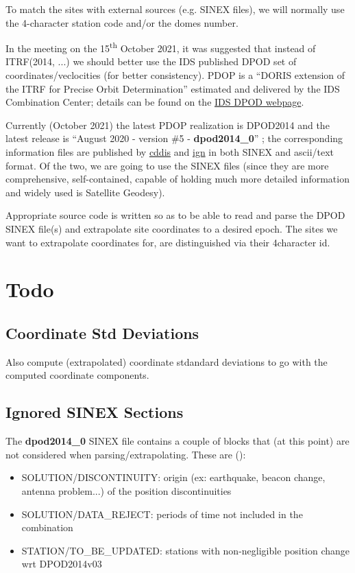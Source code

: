 To match the sites with external sources (e.g. SINEX files), we will normally use 
the 4-character station code and/or the domes number.

In the meeting on the 15\textsuperscript{th} October 2021, it was suggested that instead of ITRF(2014, ...) 
we should better use the IDS published DPOD set of coordinates/veclocities (for better 
consistency). PDOP is a ``DORIS extension of the ITRF for Precise Orbit Determination'' 
estimated and delivered by the IDS Combination Center; details can be found on the 
\href{https://ids-doris.org/analysis-coordination/combination/dpod.html}{IDS DPOD webpage}.

Currently (October 2021) the latest PDOP realization is DPOD2014 \cite{Moreaux2019118} and 
the latest release is ``August 2020 - version \#5 - \textbf{dpod2014\_0}'' \cite{Moreaux2020};
the corresponding information files are published by 
\href{ftp://cddis.gsfc.nasa.gov/pub/doris/products/dpod/dpod2014/}{cddis} and
\href{ftp://doris.ensg.ign.fr/pub/doris/products/dpod/dpod2014/}{ign} in both 
SINEX and ascii/text format. Of the two, we are going to use the SINEX files (since 
they are more comprehensive, self-contained, capable of holding much more detailed information 
and widely used is Satellite Geodesy). 

Appropriate source code is written so as to be able to read and parse the DPOD SINEX 
file(s) and extrapolate site coordinates to a desired epoch. The sites we want to 
extrapolate coordinates for, are distinguished via their 4character id.

\section{Todo}
\subsection{Coordinate Std Deviations}
Also compute (extrapolated) coordinate stdandard deviations to go with the computed coordinate components.

\subsection{Ignored SINEX Sections}
The \textbf{dpod2014\_0} SINEX file contains a couple of blocks that (at this point) are 
not considered when parsing/extrapolating. These are (\cite{Moreaux2020}):
\begin{itemize}
    \item SOLUTION/DISCONTINUITY: origin (ex: earthquake, beacon change, antenna problem...) of
the position discontinuities
    \item SOLUTION/DATA\_REJECT: periods of time not included in the combination
    \item STATION/TO\_BE\_UPDATED: stations with non-negligible position change wrt DPOD2014v03
\end{itemize}

